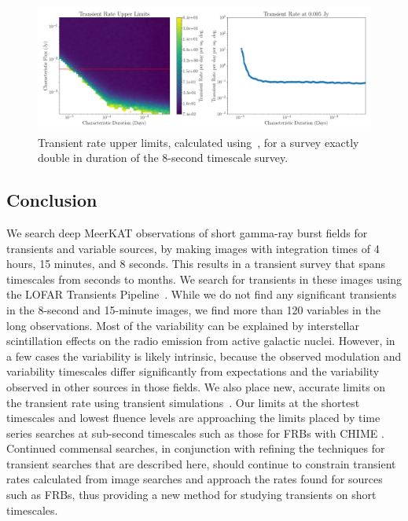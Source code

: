 \documentclass[12pt]{article}
\begin{document}
\begin{figure}
	\includegraphics[width=\textwidth]{doublerealint.png}
	\caption{Transient rate upper limits, calculated using~\citet{2022ascl.soft04007C}, for a survey exactly double in duration of the 8-second timescale survey.}
	\label{fig:doublerate}
\end{figure}

\subsection{Conclusion}
We search deep MeerKAT observations of short gamma-ray burst fields for transients and variable sources, by making images with integration times of 4 hours, 15 minutes, and 8 seconds. This results in a transient survey that spans timescales from seconds to months. We search for transients in these images using the LOFAR Transients Pipeline~\citep{2015A&C....11...25S}. While we do not find any significant transients in the 8-second and 15-minute images, we find more than 120 variables in the long observations. Most of the variability can be explained by interstellar scintillation effects on the radio emission from active galactic nuclei. However, in a few cases the variability is likely intrinsic, because the observed modulation and variability timescales differ significantly from expectations and the variability observed in other sources in those fields. We also place new, accurate limits on the transient rate using transient simulations~\citep{2022ascl.soft04007C}. Our limits at the shortest timescales and lowest fluence levels are approaching the limits placed by time series searches at sub-second timescales such as those for FRBs with CHIME \citep{2021ApJS..257...59C}. Continued commensal searches, in conjunction with refining the techniques for transient searches that are described here, should continue to constrain transient rates calculated from image searches and approach the rates found for sources such as FRBs, thus providing a new method for studying transients on short timescales.
\end{document}
